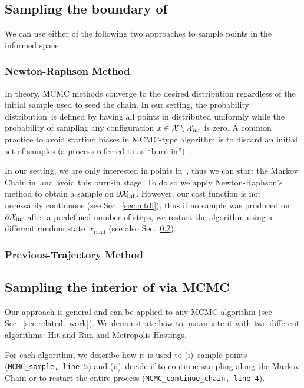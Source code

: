 \documentclass[letterpaper, 10 pt, conference]{ieeeconf}  %
\begin{document}
\subsection{Sampling the boundary of \Cinf}
\label{subsec:grad}
We can use either of the following two approaches to sample points in the informed space:
\subsubsection{Newton-Raphson Method}
In theory, MCMC methods converge to the desired distribution regardless of the initial sample used to seed the chain.
In our setting, the probability distribution~\Pinf is defined by having all points in \Cinf distributed uniformly
while 
the probability of sampling any configuration $x \in \mathcal{X} \setminus \mathcal{X}_{\rm {inf}}$ is zero.
A common practice to avoid starting biases in MCMC-type algorithm is to discard an initial set of samples (a process referred to as ``burn-in'')~\cite{ADDJ03}. 

In our setting, we are only interested in points in~\Cinf, thus we can start the Markov Chain in~\Cinf and avoid this burn-in stage. 
To do so we apply  Newton-Raphson's method to obtain a sample on $\partial \mathcal{X}_{\rm {inf}}$. 
However, our cost function is not necessarily continuous (see Sec.~\ref{sec:mtdi}), thus if no sample was produced on $\partial \mathcal{X}_{\rm {inf}}$ after a predefined number of steps, we restart the algorithm using a different random state~$x_\text{rand}$
(see also Sec.~\ref{subsec:mcmc}).

\subsubsection{Previous-Trajectory Method}


\subsection{Sampling the interior of \Cinf via MCMC}
\label{subsec:mcmc}

Our approach is general and can be applied to any MCMC algorithm (see Sec.~\ref{sec:related_work}).
We demonstrate how to instantiate it with two different algorithms: 
Hit and Run and Metropolis-Hastings.

For each algorithm, 
we describe how it is used to 
(i)~sample points 
(\texttt{MCMC\_sample, line 5})
and 
(ii)~decide if to continue sampling along the Markov Chain or to restart the entire process 
(\texttt{MCMC\_continue\_chain, line 4}).
 
\end{document}
